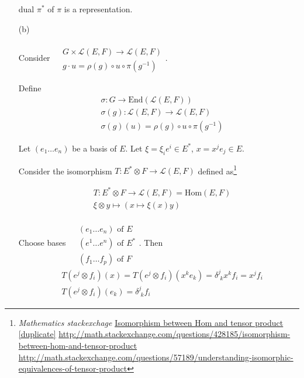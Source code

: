 \documentclass[10pt]{amsart}
\begin{document}
\begin{multicols*}{2}
\begin{enumerate}
	dual $\pi^*$ of $\pi$ is a representation.  
	
	\item[(b)]
	
	Consider $\begin{aligned} & \quad \\
	& G \times \mathcal{L}(E,F) \to \mathcal{L}(E,F) \\
	& g\cdot u = \rho(g) \circ u \circ \pi(g^{-1}) \end{aligned}$.  
	
	Define 
	\[
	\begin{aligned}
	& \sigma : G \to \text{End}(\mathcal{L}(E,F)) \\ 
	& \sigma(g):\mathcal{L}(E,F) \to \mathcal{L}(E,F) \\  
	& \sigma(g)(u) = \rho(g)\circ u \circ \pi(g^{-1})
	\end{aligned}
	\]
	
	Let $(e_1 \dots e_n)$ be a basis of $E$.  Let $\xi = \xi_i e^i \in E^*$, $x = x^j e_j \in E$.  
	
	Consider the isomorphism $T: E^*\otimes F \to \mathcal{L}(E,F)$ defined as\footnote{\emph{Mathematics stackexchage} \href{http://math.stackexchange.com/questions/428185/isomorphism-between-hom-and-tensor-product}{Isomorphism between Hom and tensor product [duplicate]} \url{http://math.stackexchange.com/questions/428185/isomorphism-between-hom-and-tensor-product} \\ \url{http://math.stackexchange.com/questions/57189/understanding-isomorphic-equivalences-of-tensor-product}}
	
	\[
	\begin{aligned}
	& T: E^*\otimes F \to \mathcal{L}(E,F) = \text{Hom}(E,F) \\
	& \xi \otimes y  \mapsto (x \mapsto \xi(x)y)
	\end{aligned}
	\]
	
	Choose bases $\begin{aligned} & \quad \\
	& (e_1 \dots e_n) \text{ of } E \\
	& (e^1 \dots e^n) \text{ of } E^* \\  
	& (f_1 \dots f_p) \text{ of } F 
	\end{aligned}$.  Then
	\[
	\begin{aligned}
	& T(e^j\otimes f_i)(x) = T(e^j\otimes f_i)(x^ke_k) = \delta^j_{\,\,k} x^k f_i = x^j f_i \\
	& T(e^j\otimes f_i)(e_k) = \delta^j_{\,\,k}f_i
	\end{aligned}
	\]
	

\end{enumerate}
\end{multicols*}
\end{document}
